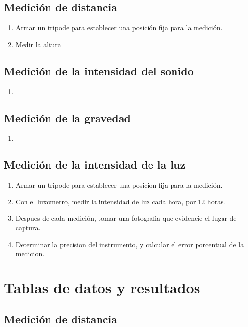\documentclass[letter,11pt]{article}
\begin{document}
\subsection{Medición de distancia}
\begin{enumerate}
\item Armar un tripode para establecer una posición fija para la medición.
\item Medir la altura
\end{enumerate}

\subsection{Medición de la intensidad del sonido}
\begin{enumerate}
\item 
\end{enumerate}

\subsection{Medición de la gravedad}
\begin{enumerate}
\item 
\end{enumerate}

\subsection{Medición de la intensidad de la luz}
\begin{enumerate}
\item Armar un tripode para establecer una posicion fija para la medición.
\item Con el luxometro, medir la intensidad de luz cada hora, por 12 horas.
\item Despues de cada medición, tomar una fotografia que evidencie el lugar de captura.
\item Determinar la precision del instrumento, y calcular el error porcentual de la medicion.
\end{enumerate}

\section{Tablas de datos y resultados}

\subsection{Medición de distancia}
\end{document}
